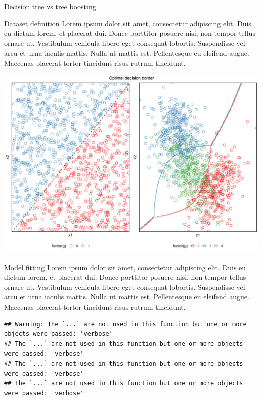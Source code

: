 \documentclass[
  ignorenonframetext,
]{article}
\begin{document}
\begin{frame}[fragile]{Decision tree vs tree boosting}
\protect\hypertarget{decision-tree-vs-tree-boosting}{}
\begin{block}{Dataset definition}
\protect\hypertarget{dataset-definition-3}{}
Lorem ipsum dolor sit amet, consectetur adipiscing elit. Duis eu dictum lorem, et placerat dui. Donec porttitor posuere nisi, non tempor tellus ornare ut. Vestibulum vehicula libero eget consequat lobortis. Suspendisse vel arcu et urna iaculis mattis. Nulla ut mattis est. Pellentesque eu eleifend augue. Maecenas placerat tortor tincidunt risus rutrum tincidunt.

\begin{center}\includegraphics{_main_files/figure-beamer/unnamed-chunk-53-1} \end{center}
\end{block}

\begin{block}{Model fitting}
\protect\hypertarget{model-fitting-3}{}
Lorem ipsum dolor sit amet, consectetur adipiscing elit. Duis eu dictum lorem, et placerat dui. Donec porttitor posuere nisi, non tempor tellus ornare ut. Vestibulum vehicula libero eget consequat lobortis. Suspendisse vel arcu et urna iaculis mattis. Nulla ut mattis est. Pellentesque eu eleifend augue. Maecenas placerat tortor tincidunt risus rutrum tincidunt.

\begin{verbatim}
## Warning: The `...` are not used in this function but one or more objects were passed: 'verbose'
## The `...` are not used in this function but one or more objects were passed: 'verbose'
## The `...` are not used in this function but one or more objects were passed: 'verbose'
## The `...` are not used in this function but one or more objects were passed: 'verbose'
\end{verbatim}
\end{block}


\end{frame}
\end{document}
